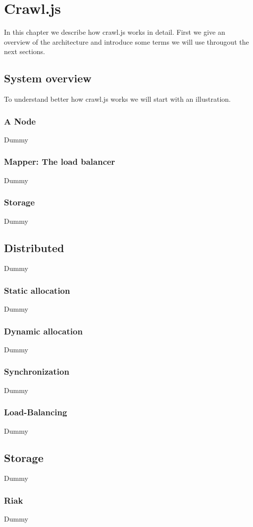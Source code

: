 
\chapter{Crawl.js} %
In this chapter we describe how crawl.js works in detail. First we give an overview of the architecture and introduce some terms we will use througout the next sections. 
\label{Chapter4} 

\section{System overview}
To understand better how crawl.js works we will start with an illustration.
\subsection{A Node}
Dummy
\subsection{Mapper: The load balancer}
Dummy
\subsection{Storage}
Dummy

\section{Distributed}
Dummy
\subsection{Static allocation}
Dummy
\subsection{Dynamic allocation}
Dummy
\subsection{Synchronization}
Dummy
\subsection{Load-Balancing}
Dummy

\section{Storage}
Dummy
\subsection{Riak}
Dummy
